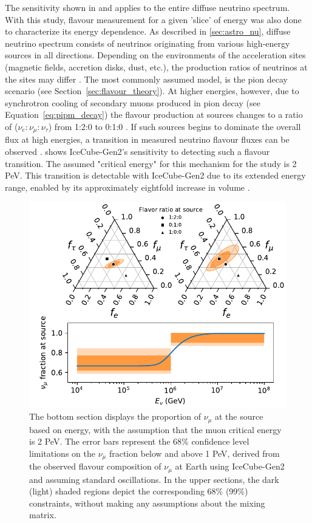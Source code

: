 The sensitivity shown in  and applies to the entire diffuse neutrino spectrum. With this study, flavour measurement for a given 'slice' of energy was also done to characterize its energy dependence. As described in \ref{sec:astro_nu}, diffuse neutrino spectrum consists of neutrinos originating from various high-energy sources in all directions. Depending on the environments of the acceleration sites (magnetic fields, accretion disks, dust, etc.), the production ratios of neutrinos at the sites may differ . The most commonly assumed model, is the pion decay scenario (see Section~\ref{sec:flavour_theory}). At higher energies, however, due to synchrotron cooling of secondary muons produced in pion decay (see Equation~\ref{eq:pipm_decay}) the flavour production at sources changes to a ratio of ($\nu_e:\nu_{\mu}:\nu_{\tau}$) from 1:2:0 to 0:1:0 . If such sources begins to dominate the overall flux at high energies, a transition in measured neutrino flavour fluxes can be observed .  shows IceCube-Gen2's sensitivity to detecting such a flavour transition. The assumed "critical energy" for this mechanism for the study is 2 PeV. This transition is detectable with IceCube-Gen2 due to its extended energy range, enabled by its approximately eightfold increase in volume .

\begin{figure}[h!]
\centering
    \includegraphics{./figures/gen2/MuonDamped.pdf}
    \caption[Sensitivity of IceCube-Gen2 to measure an energy dependent flavour composition of Astrophysical neutrino]{The bottom section displays the proportion of $\nu_{\mu}$ at the source based on energy, with the assumption that the muon critical energy is 2 PeV. The error bars represent the 68\% confidence level limitations on the $\nu_{\mu}$ fraction below and above 1 PeV, derived from the observed flavour composition of $\nu_{\mu}$ at Earth using IceCube-Gen2 and assuming standard oscillations. In the upper sections, the dark (light) shaded regions depict the corresponding 68\% (99\%) constraints, without making any assumptions about the mixing matrix.}
\end{figure}

